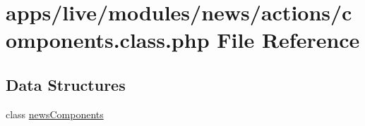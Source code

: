\hypertarget{live_2modules_2news_2actions_2components_8class_8php}{\section{apps/live/modules/news/actions/components.class.\-php File Reference}
\label{live_2modules_2news_2actions_2components_8class_8php}
}
\subsection*{Data Structures}
\begin{DoxyCompactItemize}
\item 
class \hyperlink{classnews_components}{news\-Components}
\end{DoxyCompactItemize}
